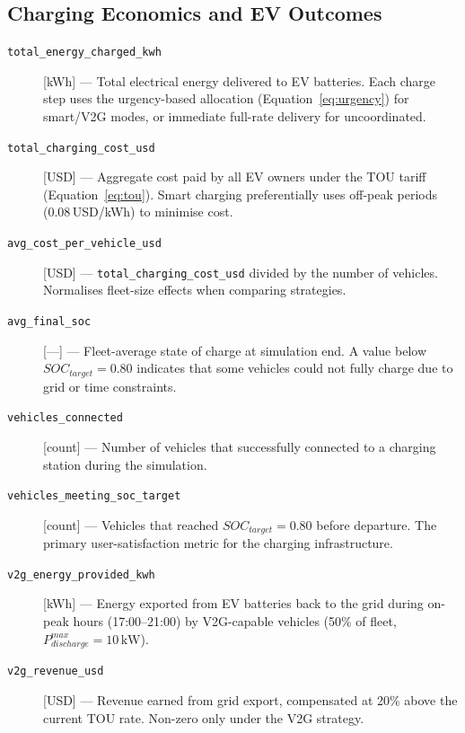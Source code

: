 \subsection*{Charging Economics and EV Outcomes}

\begin{description}

\item[\texttt{total\_energy\_charged\_kwh}] [kWh] ---
  Total electrical energy delivered to EV batteries.  Each charge step uses the
  urgency-based allocation (Equation~\ref{eq:urgency}) for smart/V2G modes, or
  immediate full-rate delivery for uncoordinated.

\item[\texttt{total\_charging\_cost\_usd}] [USD] ---
  Aggregate cost paid by all EV owners under the TOU tariff
  (Equation~\ref{eq:tou}).  Smart charging preferentially uses off-peak
  periods (0.08\,USD/kWh) to minimise cost.

\item[\texttt{avg\_cost\_per\_vehicle\_usd}] [USD] ---
  \texttt{total\_charging\_cost\_usd} divided by the number of vehicles.
  Normalises fleet-size effects when comparing strategies.

\item[\texttt{avg\_final\_soc}] [---] ---
  Fleet-average state of charge at simulation end.  A value below
  $SOC_{target} = 0.80$ indicates that some vehicles could not fully charge
  due to grid or time constraints.

\item[\texttt{vehicles\_connected}] [count] ---
  Number of vehicles that successfully connected to a charging station during
  the simulation.

\item[\texttt{vehicles\_meeting\_soc\_target}] [count] ---
  Vehicles that reached $SOC_{target} = 0.80$ before departure.  The primary
  user-satisfaction metric for the charging infrastructure.

\item[\texttt{v2g\_energy\_provided\_kwh}] [kWh] ---
  Energy exported from EV batteries back to the grid during on-peak hours
  (17:00--21:00) by V2G-capable vehicles
  (50\% of fleet, $P_{discharge}^{max} = 10\,\text{kW}$).

\item[\texttt{v2g\_revenue\_usd}] [USD] ---
  Revenue earned from grid export, compensated at 20\% above the current TOU
  rate.  Non-zero only under the V2G strategy.

\end{description}

